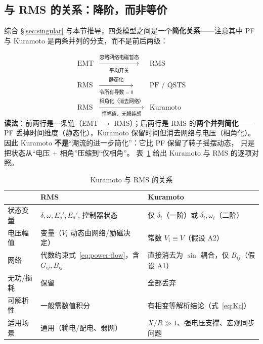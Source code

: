 \subsection{与 RMS 的关系：降阶，而非等价}

综合 \S\ref{sec:singular} 与本节推导，四类模型之间是一个\textbf{简化关系}——注意其中
PF 与 Kuramoto 是两条并列的分支，而不是前后两级：

\begin{equation}
\begin{array}{rcl}
\text{EMT} & \xrightarrow[\text{平均开关}]{\text{忽略网络电磁暂态}} & \text{RMS}\\[5pt]
\text{RMS} & \xrightarrow[\text{令所有导数}=0]{\ \ \text{静态化}\ \ } & \text{PF / QSTS}\\[5pt]
\text{RMS} & \xrightarrow[\text{恒幅值、无损纯感}]{\text{相角化（消去网络）}} & \text{Kuramoto}
\end{array}
\label{eq:chain}
\end{equation}
\textbf{读法}：前两行是一条链（EMT $\to$ RMS）；后两行是 RMS 的\textbf{两个并列简化}——
PF 丢掉时间维度（静态化），Kuramoto 保留时间但消去网络与电压（相角化）。
因此 Kuramoto \textbf{不是}“潮流的进一步简化”：它比 PF 保留了转子摇摆动态，
只是把状态从“电压 $+$ 相角”压缩到“仅相角”。
表~\ref{tab:kuramoto-rms} 给出 Kuramoto 与 RMS 的逐项对照。

\begin{table}[htbp]
\centering
\caption{Kuramoto 与 RMS 的关系}
\label{tab:kuramoto-rms}
\small
\begin{tabularx}{\textwidth}{@{}lXX@{}}
\toprule
 & \textbf{RMS} & \textbf{Kuramoto} \\
\midrule
状态变量 & $\delta,\omega,E_q',E_d'$, 控制器状态 & 仅 $\delta_i$（一阶）或 $\delta_i,\omega_i$（二阶） \\
电压幅值 & 变量（$V_i$ 动态由网络/励磁决定） & 常数 $V_i\equiv V$（假设 A2） \\
网络 & 代数约束式~\eqref{eq:power-flow}，含 $G_{ij},B_{ij}$ & 直接消去为 $\sin$ 耦合，仅 $B_{ij}$（假设 A1） \\
无功/损耗 & 保留 & 全部丢弃 \\
可解析性 & 一般需数值积分 & 有相变等解析结论（式~\eqref{eq:Kc}） \\
适用场景 & 通用（输电/配电、弱网） & $X/R\gg1$、强电压支撑、宏观同步问题 \\
\bottomrule
\end{tabularx}
\end{table}

